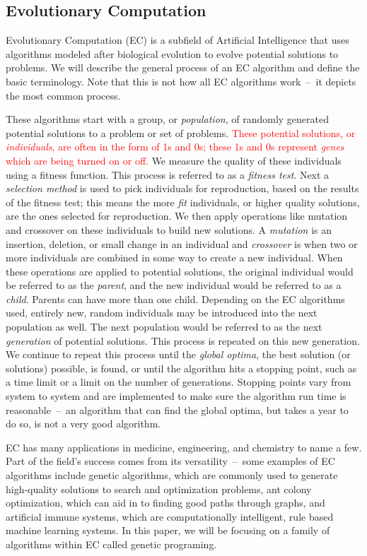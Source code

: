\documentclass{sig-alternate}
\begin{document}
\subsection{Evolutionary Computation}
\label{sec:evocomp}
Evolutionary Computation (EC) is a subfield of Artificial Intelligence that uses algorithms modeled after biological evolution to evolve potential solutions to problems. We will describe the general process of an EC algorithm and define the basic terminology. Note that this is not how all EC algorithms work~--~it depicts the most common process.

These algorithms start with a group, or \textit{population}, of randomly generated potential solutions to a problem or set of problems. \textcolor{red}{These potential solutions, or \textit{individuals}, are often in the form of 1s and 0s; these 1s and 0s represent \textit{genes} which are being turned on or off.}  We measure the quality of these individuals using a fitness function. This process is referred to as a \textit{fitness test}. Next a \textit{selection method} is used to pick individuals for reproduction, based on the results of the fitness test; this means the more \textit{fit} individuals, or higher quality solutions, are the ones selected for reproduction. We then apply operations like mutation and crossover on these individuals to build new solutions. A \textit{mutation} is an insertion, deletion, or small change in an individual and \textit{crossover} is when two or more individuals are combined in some way to create a new individual. When these operations are applied to potential solutions, the original individual would be referred to as the \textit{parent}, and the new individual would be referred to as a \textit{child}. Parents can have more than one child. Depending on the EC algorithms used, entirely new, random individuals may be introduced into the next population as well. The next population would be referred to as the next \textit{generation} of potential solutions. This process is repeated on this new generation. We continue to repeat this process until the \textit{global optima}, the best solution (or solutions) possible, is found, or until the algorithm hits a stopping point, such as a time limit or a limit on the number of generations. Stopping points vary from system to system and are implemented to make sure the algorithm run time is reasonable~--~an algorithm that can find the global optima, but takes a year to do so, is not a very good algorithm.

EC has many applications in medicine, engineering, and chemistry to name a few. Part of the field's success comes from its versatility~--~some examples of EC algorithms include genetic algorithms, which are commonly used to generate high-quality solutions to search and optimization problems, ant colony optimization, which can aid in to finding good paths through graphs, and artificial immune systems, which are computationally intelligent, rule based machine learning systems. In this paper, we will be focusing on a family of algorithms within EC called genetic programing.
\end{document}
